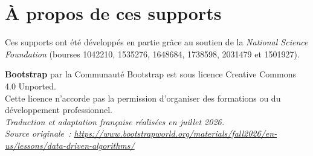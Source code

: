 \documentclass[12pt,a4paper]{article}
\begin{document}
\section*{À propos de ces supports}

Ces supports ont été développés en partie grâce au soutien de la \emph{National Science Foundation} (bourses 1042210, 1535276, 1648684, 1738598, 2031479 et 1501927).

\begin{center}
  \textbf{Bootstrap} par la Communauté Bootstrap est sous licence Creative Commons 4.0 Unported.\\
  Cette licence n'accorde pas la permission d'organiser des formations ou du développement professionnel.\\[1em]
  \textit{Traduction et adaptation française réalisées en juillet 2026.}\\
  \textit{Source originale~: \url{https://www.bootstrapworld.org/materials/fall2026/en-us/lessons/data-driven-algorithms/}}
\end{center}
\end{document}
